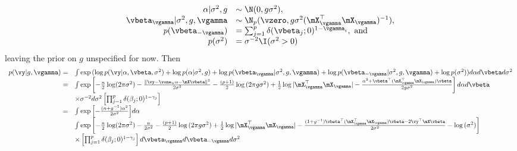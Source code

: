 $$
\begin{array}{rl}
	\alpha | \sigma^2, g &\sim \N(0, g \sigma^2), \\
	\vbeta_\vgamma | \sigma^2, g, \vgamma &\sim \N_p(\vzero, g \sigma^2 (\mX_\vgamma^\top \mX_\vgamma)^{-1}), \\
	p(\vbeta_{-\vgamma}) &= \sum_{j=1}^p \delta(\vbeta_j; 0)^{1 - \vgamma_i}, \text{ and } \\
	p(\sigma^2) &= \sigma^{-2} \I(\sigma^2 > 0)
\end{array}
$$
leaving the prior on $g$ unspecified for now. Then
$$
\begin{array}{rl}
	p(\vy | g, \vgamma) =&
	\int \exp{(\log p(\vy | \alpha, \vbeta, \sigma^2)
	+ \log p(\alpha | \sigma^2, g)
	+ \log p(\vbeta_\vgamma | \sigma^2, g, \vgamma)
	+ \log p(\vbeta_{-\vgamma} | \sigma^2, g, \vgamma)
	+ \log p(\sigma^2))} d \alpha d \vbeta d \sigma^2 \\
	=& \int \exp{\left[
	-\frac{n}{2} \log (2 \pi \sigma^2)
	- \frac{\|\vy - \vone_n \alpha - \mX \vbeta\|^2}{2 \sigma^2} 
	-\frac{(p + 1)}{2} \log{(2\pi g \sigma^2)}
	+ \frac{1}{2} \log{|\mX_\vgamma^\top \mX_\vgamma|}
	- \frac{\alpha^2 + \vbeta^\top (\mX_\vgamma^\top \mX_\vgamma) \vbeta}{2 g \sigma^{2}} \right] d \alpha d \vbeta } \\
	&\times \sigma^{-2} d \sigma^2
	\left[ \prod_{j=1}^p \delta(\beta_j; 0)^{1 - \gamma_j} \right] \\
	=& \int \exp{\left[
	-\frac{(n + g^{-1})\alpha^2}{2 \sigma^2} \right]} d \alpha \\
	&  \int \exp{\left[
	-\frac{n}{2} \log (2 \pi \sigma^2)
	-\frac{n}{2 \sigma^2} 
	-\frac{(p + 1)}{2} \log{(2\pi g \sigma^2)}
	+ \frac{1}{2} \log{|\mX_\vgamma^\top \mX_\vgamma|}
	- \frac{(1 + g^{-1})\vbeta^\top (\mX_\vgamma^\top \mX_\vgamma) \vbeta - 2 \vy^\top \mX \vbeta}{2 \sigma^{2}}
	-\log{(\sigma^2)}
	\right]}  \\
	&\times \left[ \prod_{j=1}^p \delta(\beta_j; 0)^{1 - \gamma_j} \right] d \vbeta_\vgamma d \vbeta_{-\vgamma} d \sigma^2
\end{array}
$$

